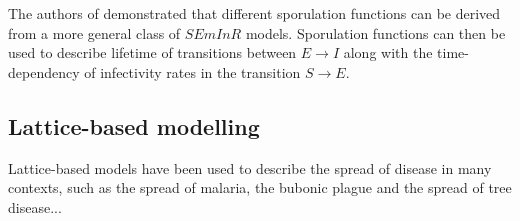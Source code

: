\cite{segarra2001epidemic}

The authors of \cite{time-varying-infectivity} demonstrated that different sporulation functions can be derived from a more general class of $SEmInR$ models. 
Sporulation functions can then be used to describe lifetime of transitions between $E\rightarrow I$ along with the time-dependency of infectivity rates in the transition $S\rightarrow E$. 





\subsection{Lattice-based modelling}
Lattice-based models have been used to describe the spread of disease in many contexts, such as the spread of malaria, the bubonic plague and the spread of tree disease...


